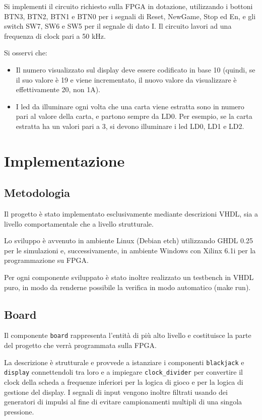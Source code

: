 \documentclass [11pt,a4paper,oneside]{article}
\newcommand{\component}[1]{\texttt{#1}}
\begin{document}
Si implementi il circuito richiesto sulla FPGA in dotazione, utilizzando i bottoni BTN3,
BTN2, BTN1 e BTN0 per i segnali di Reset, NewGame, Stop ed En, e gli switch
SW7, SW6 e SW5 per il segnale di dato I. Il circuito lavori ad una frequenza di clock
pari a 50 kHz.

Si osservi che:
\begin{itemize}
\item Il numero visualizzato sul display deve essere codificato in base 10 (quindi, se
      il suo valore è 19 e viene incrementato, il nuovo valore da visualizzare è
      effettivamente 20, non 1A).

\item I led da illuminare ogni volta che una carta viene estratta sono in numero pari
      al valore della carta, e partono sempre da LD0. Per esempio, se la carta
      estratta ha un valori pari a 3, si devono illuminare i led LD0, LD1 e LD2.
\end{itemize}


\section{Implementazione}
\subsection{Metodologia}
Il progetto è stato implementato esclusivamente mediante descrizioni VHDL, sia a
livello comportamentale che a livello strutturale.

Lo sviluppo è avvenuto in ambiente Linux (Debian etch) utilizzando GHDL 0.25 per le
simulazioni e, successivamente, in ambiente Windows con Xilinx 6.1i per la
programmazione su FPGA.

Per ogni componente sviluppato è stato inoltre realizzato un testbench in VHDL 
puro, in modo da renderne possibile la verifica in modo automatico (make run). %

\subsection{Board}
Il componente \component{board} rappresenta l'entità di più alto livello e costituisce
la parte del progetto che verrà programmata sulla FPGA.



La descrizione è strutturale e provvede a istanziare i componenti \component{blackjack}
e \component{display} connettendoli tra loro e a impiegare \component{clock\_divider} per 
convertire il clock della scheda a frequenze inferiori per la logica di 
gioco e per la logica di gestione del display. I segnali di input vengono 
inoltre filtrati usando dei generatori di impulsi al fine di evitare 
campionamenti multipli di una singola pressione.
\end{document}

